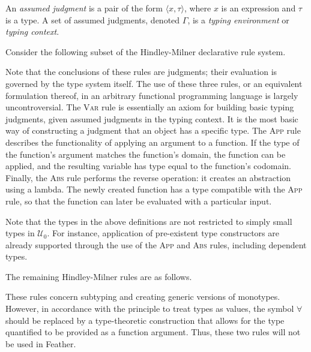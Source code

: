 \documentclass[UKenglish, 11pt, a4paper, parskip=half]{scrbook}
\begin{document}
\begin{defn}
    An \textit{assumed judgment} is a pair of the form \( \langle x, \tau \rangle \), where \( x \) is an expression and \( \tau \) is a type.
    A set of assumed judgments, denoted \( \Gamma \), is a \textit{typing environment} or \textit{typing context}.
\end{defn}
Consider the following subset of the Hindley-Milner declarative rule system.
Note that the conclusions of these rules are judgments; their evaluation is governed by the type system itself.
The use of these three rules, or an equivalent formulation thereof, in an arbitrary functional programming language is largely uncontroversial.
The \textsc{Var} rule is essentially an axiom for building basic typing judgments, given assumed judgments in the typing context.
It is the most basic way of constructing a judgment that an object has a specific type.
The \textsc{App} rule describes the functionality of applying an argument to a function.
If the type of the function's argument matches the function's domain, the function can be applied, and the resulting variable has type equal to the function's codomain.
Finally, the \textsc{Abs} rule performs the reverse operation: it creates an abstraction using a lambda.
The newly created function has a type compatible with the \textsc{App} rule, so that the function can later be evaluated with a particular input.

Note that the types in the above definitions are not restricted to simply small types in \( \mathcal U_0 \).
For instance, application of pre-existent type constructors are already supported through the use of the \textsc{App} and \textsc{Abs} rules, including dependent types.

The remaining Hindley-Milner rules are as follows.
These rules concern subtyping and creating generic versions of monotypes.
However, in accordance with the principle to treat types as values, the symbol \( \forall \) should be replaced by a type-theoretic construction that allows for the type quantified to be provided as a function argument.
Thus, these two rules will not be used in Feather.
\end{document}
